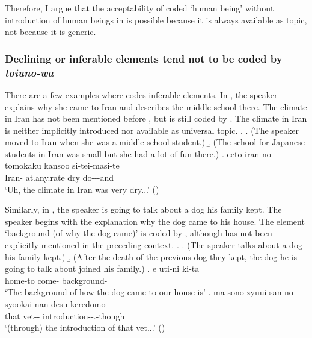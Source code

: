 Therefore,
I argue that the acceptability of  coded `human being' without introduction of human beings in \LLast is possible
because it is always available as topic,
not because it is generic.


\subsubsection{Declining or inferable elements tend not to be coded by \textit{toiuno-wa}}\label{Toiuno-waInfSemiActUnuse}

There are a few examples
where  codes inferable elements.
In \Next,
the speaker explains why she came to Iran and describes the middle school there.
The climate in Iran has not been mentioned before \Next[c],
but is still coded by .
The climate in Iran is neither implicitly introduced nor available as universal topic.
\ex. \label{IranClimate}
 \a. (The speaker moved to Iran when she was a middle school student.)
 \b. (The school for Japanese students in Iran was small but she had a lot of fun there.)
 \bg. eeto iran-no  tomokaku kansoo si-tei-masi-te \\
 	 Iran-  at.any.rate dry do---and \\
	`Uh, the climate in Iran was very dry...'
	\hfill{()}
%

Similarly, in \Next[c],
the speaker is going to talk about a dog his family kept.
The speaker begins with the explanation why the dog came to his house.
The element  `background (of why the dog came)' is coded by ,
although  has not been explicitly mentioned in the preceding context.
%
\ex.
 \a. (The speaker talks about a dog his family kept.)
 \b. (After the death of the previous dog they kept, the dog he is going to talk about joined his family.)
 \bg. e uti-ni ki-ta  \\
 	 home-to come- background- \\
	`The background of how the dog came to our house is'
 \bg. ma sono zyuui-san-no syookai-nan-desu-keredomo \\
 	 that vet-- introduction--.-though \\
	`(through) the introduction of that vet...'
	\hfill{()}



